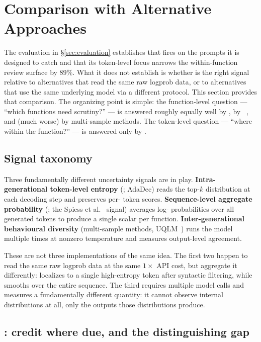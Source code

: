 \section{Comparison with Alternative Approaches}
\label{sec:comparison}

The evaluation in \S\ref{sec:evaluation} establishes that \eps fires
on the prompts it is designed to catch and that its token-level
focus narrows the within-function review surface by $89\%$.
What it does not establish is whether \eps is the right signal
relative to alternatives that read the same raw logprob data, or to
alternatives that use the same underlying model via a different
protocol. This section provides that comparison. The organizing
point is simple: the function-level question --- ``which functions
need scrutiny?'' --- is answered roughly equally well by \eps, by
\papg~\cite{spiess2025calibration}, and (much worse) by multi-sample
methods. The token-level question --- ``where within the function?''
--- is answered only by \eps.

\subsection{Signal taxonomy}
\label{subsec:signal-taxonomy}

Three fundamentally different uncertainty signals are in play.
\textbf{Intra-generational token-level entropy} (\eps; AdaDec) reads
the top-$k$ distribution at each decoding step and preserves per-%
token scores. \textbf{Sequence-level aggregate probability} (\papg;
the Spiess et al.~\cite{spiess2025calibration} signal) averages log-%
probabilities over all generated tokens to produce a single scalar
per function. \textbf{Inter-generational behavioural diversity}
(multi-sample methods, UQLM~\cite{uqlm2024}) runs the model multiple
times at nonzero temperature and measures output-level agreement.

These are not three implementations of the same idea. The first two
happen to read the same raw logprob data at the same $1\times$ API
cost, but aggregate it differently: \eps localizes to a single
high-entropy token after syntactic filtering, while \papg smooths
over the entire sequence. The third requires multiple model calls
and measures a fundamentally different quantity: it cannot observe
internal distributions at all, only the outputs those distributions
produce.

\subsection{\papg: credit where due, and the distinguishing gap}
\label{subsec:papg-comp}

